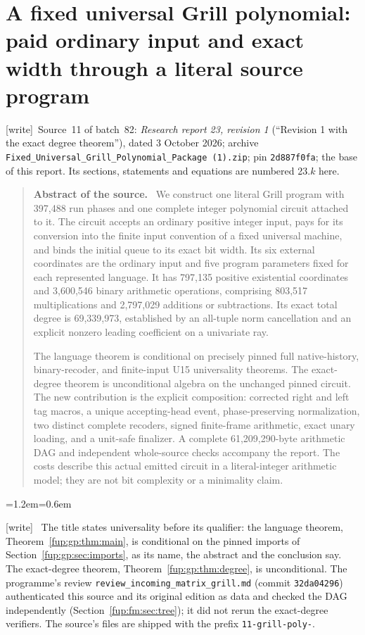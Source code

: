 \documentclass[11pt,letterpaper]{article}
\theoremstyle{definition}\newtheorem{definition}[theorem]{Definition}
\theoremstyle{remark}\newtheorem{remark}[theorem]{Remark}
\newcommand{\wtag}{\textup{[write]}}
\newenvironment{writenote}{\par\smallskip\begin{list}{}{\leftmargin=1.2em\rightmargin=0.6em}\item[]\small\wtag\ }{\end{list}\smallskip}
\newenvironment{sourceabstract}{\par\begin{quote}\small\textbf{Abstract of the source.}\ }{\end{quote}}
\newcommand{\rw}[1]{\nolinkurl{#1}}%
\begin{document}
\part{A fixed universal Grill polynomial: paid ordinary input and exact width through a literal source program}\label{fup:part:gp}
\noindent\wtag\ Source~11 of batch~82: \emph{Research report 23, revision 1} (``Revision 1 with the exact degree theorem''), dated 3 October 2026; archive \rw{Fixed_Universal_Grill_Polynomial_Package (1).zip}; pin \texttt{2d887f0fa}; the base of this report. Its sections, statements and equations are numbered 23.$k$ here.
\begin{sourceabstract}
We construct one literal Grill program with 397,488 run phases and one complete integer polynomial circuit attached to it. The circuit accepts an ordinary positive integer input, pays for its conversion into the finite input convention of a fixed universal machine, and binds the initial queue to its exact bit width. Its six external coordinates are the ordinary input and five program parameters fixed for each represented language. It has 797,135 positive existential coordinates and 3,600,546 binary arithmetic operations, comprising 803,517 multiplications and 2,797,029 additions or subtractions. Its exact total degree is 69,339,973, established by an all-tuple norm cancellation and an explicit nonzero leading coefficient on a univariate ray.

The language theorem is conditional on precisely pinned full native-history, binary-recoder, and finite-input U15 universality theorems. The exact-degree theorem is unconditional algebra on the unchanged pinned circuit. The new contribution is the explicit composition: corrected right and left tag macros, a unique accepting-head event, phase-preserving normalization, two distinct complete recoders, signed finite-frame arithmetic, exact unary loading, and a unit-safe finalizer. A complete 61,209,290-byte arithmetic DAG and independent whole-source checks accompany the report. The costs describe this actual emitted circuit in a literal-integer arithmetic model; they are not bit complexity or a minimality claim.
\end{sourceabstract}
\begin{writenote}
The title states universality before its qualifier: the language theorem, Theorem~\ref{fup:gp:thm:main}, is conditional on the pinned imports of Section~\ref{fup:gp:sec:imports}, as its name, the abstract and the conclusion say. The exact-degree theorem, Theorem~\ref{fup:gp:thm:degree}, is unconditional. The programme's review \rw{review_incoming_matrix_grill.md} (commit \texttt{32da04296}) authenticated this source and its original edition as data and checked the DAG independently (Section~\ref{fup:fm:sec:tree}); it did not rerun the exact-degree verifiers. The source's files are shipped with the prefix \texttt{11-grill-poly-}.
\end{writenote}
\end{document}
